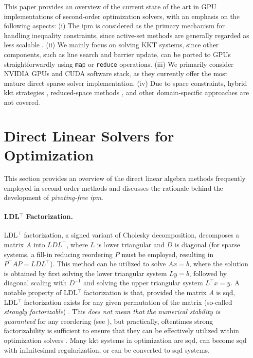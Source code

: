 \documentclass{article}
\begin{document}
This paper provides an overview of the current state of the art in GPU implementations of second-order optimization solvers, with an emphasis on the following aspects:
(i) The \gls*{ipm} is considered as the primary mechanism for handling inequality constraints, since active-set methods are generally regarded as less scalable \cite{nocedalNumericalOptimization2006}.
(ii) We mainly focus on solving KKT systems, since other components, such as line search and barrier update, can be ported to GPUs straightforwardly using \texttt{map} or \texttt{reduce} operations.
(iii) We primarily consider NVIDIA GPUs and CUDA software stack, as they currently offer the most mature direct sparse solver implementation.
(iv) Due to space constraints, hybrid \gls*{kkt} strategies \cite{regevHyKKTHybridDirectiterative2023}, reduced-space methods \cite{pacaudAcceleratingCondensedInteriorPoint2023}, and other domain-specific approaches \cite{adabagMPCGPURealTimeNonlinear2024} are not covered.

\section{Direct Linear Solvers for Optimization}\label{eqn:linear}
This section provides an overview of the direct linear algebra methods frequently employed in second-order methods and discusses the rationale behind the development of \emph{pivoting-free \gls*{ipm}}.

\paragraph{LDL$^\top$ Factorization.}
LDL$^\top$ factorization, a signed variant of Cholesky decomposition, decomposes a matrix $A$ into $LDL^\top$, where $L$ is lower triangular and $D$ is diagonal (for sparse systems, a fill-in reducing reordering $P$ must be employed, resulting in $P^\top A P= L D L^\top$). This method can be utilized to solve $Ax = b$, where the solution is obtained by first solving the lower triangular system $Ly = b$, followed by diagonal scaling with $D^{-1}$ and solving the upper triangular system $L^\top x = y$.
A notable property of LDL$^\top$ factorization is that, provided the matrix $A$ is \gls*{sqd}, LDL$^\top$ factorization exists for any given permutation of the matrix (so-called \emph{strongly factorizable}) \cite{vanderbeiSymmetricQuasidefiniteMatrices1995}.
This \emph{does not mean that the numerical stability is guaranteed} for any reordering (see \cite{vanderbeiSymmetricQuasidefiniteMatrices1995}), but practically, oftentimes strong factorizability is sufficient to ensure that they can be effectively utilized within optimization solvers \cite{stellatoOSQPOperatorSplitting2020}.
Many \gls*{kkt} systems in optimization are \gls*{sqd}, can become \gls*{sqd} with infinitesimal regularization, or can be converted to \gls*{sqd} systems.
\end{document}
